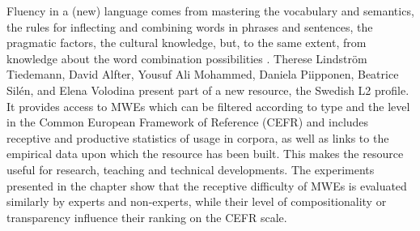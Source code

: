 \begin{refsection}
Fluency in a (new) language comes from mastering the vocabulary and semantics, the rules for inflecting and combining words in phrases and sentences, the pragmatic factors, the cultural knowledge, but, to the same extent, from knowledge about the word combination possibilities \citep{RamischHab}. 
Therese Lindström Tiedemann, David Alfter, Yousuf Ali Mohammed, Daniela Piipponen, Beatrice Silén, and Elena Volodina present part of a new resource, the Swedish L2 profile. %
It provides access to MWEs which can be filtered according to type and the level in the Common European Framework of Reference (CEFR) and includes receptive and productive statistics of usage in corpora, as well as links to the empirical data upon which the resource has been built. This makes the resource useful for research, teaching and technical developments. The experiments presented in the chapter show that the receptive difficulty of MWEs is evaluated similarly by experts and non-experts, while their level of compositionality or transparency influence their ranking on the CEFR scale.


\end{refsection}
